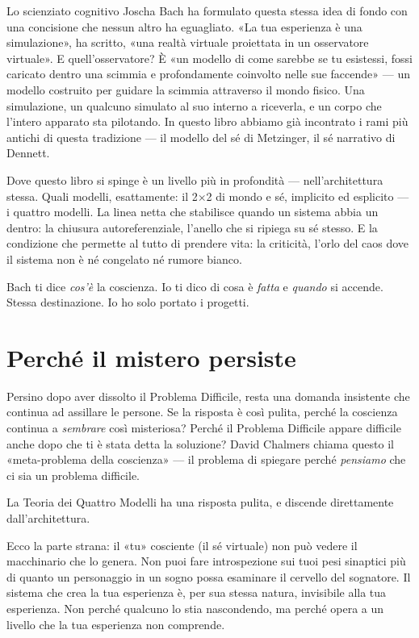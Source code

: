 \documentclass[11pt, twoside, openright]{book}
\begin{document}
Lo scienziato cognitivo Joscha Bach ha formulato questa stessa idea di fondo con una concisione che nessun altro ha eguagliato. «La tua esperienza è una simulazione», ha scritto, «una realtà virtuale proiettata in un osservatore virtuale». E quell'osservatore? È «un modello di come sarebbe se tu esistessi, fossi caricato dentro una scimmia e profondamente coinvolto nelle sue faccende» --- un modello costruito per guidare la scimmia attraverso il mondo fisico. Una simulazione, un qualcuno simulato al suo interno a riceverla, e un corpo che l'intero apparato sta pilotando. In questo libro abbiamo già incontrato i rami più antichi di questa tradizione --- il modello del sé di Metzinger, il sé narrativo di Dennett.

Dove questo libro si spinge è un livello più in profondità --- nell'architettura stessa. Quali modelli, esattamente: il 2×2 di mondo e sé, implicito ed esplicito --- i quattro modelli. La linea netta che stabilisce quando un sistema abbia un dentro: la chiusura autoreferenziale, l'anello che si ripiega su sé stesso. E la condizione che permette al tutto di prendere vita: la criticità, l'orlo del caos dove il sistema non è né congelato né rumore bianco.

Bach ti dice \textit{cos'è} la coscienza. Io ti dico di cosa è \textit{fatta} e \textit{quando} si accende. Stessa destinazione. Io ho solo portato i progetti.

\section*{Perché il mistero persiste}

Persino dopo aver dissolto il Problema Difficile, resta una domanda insistente che continua ad assillare le persone. Se la risposta è così pulita, perché la coscienza continua a \textit{sembrare} così misteriosa? Perché il Problema Difficile appare difficile anche dopo che ti è stata detta la soluzione? David Chalmers chiama questo il «meta-problema della coscienza» --- il problema di spiegare perché \textit{pensiamo} che ci sia un problema difficile.

La Teoria dei Quattro Modelli ha una risposta pulita, e discende direttamente dall'architettura.

Ecco la parte strana: il «tu» cosciente (il sé virtuale) non può vedere il macchinario che lo genera. Non puoi fare introspezione sui tuoi pesi sinaptici più di quanto un personaggio in un sogno possa esaminare il cervello del sognatore. Il sistema che crea la tua esperienza è, per sua stessa natura, invisibile alla tua esperienza. Non perché qualcuno lo stia nascondendo, ma perché opera a un livello che la tua esperienza non comprende.
\end{document}

